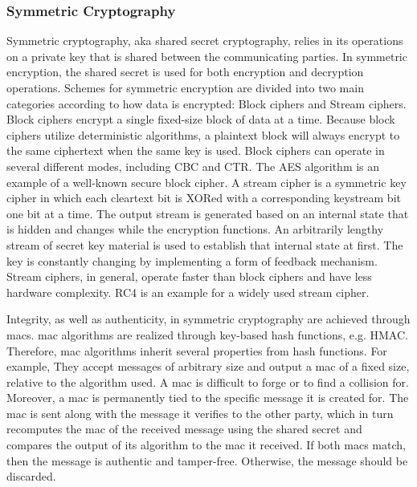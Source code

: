 \subsubsection{Symmetric Cryptography}
Symmetric cryptography, aka shared secret cryptography, relies in its operations on a private key that is shared between the communicating parties. In symmetric encryption, the shared secret is used for both encryption and decryption operations. Schemes for symmetric encryption are divided into two main categories according to how data is encrypted: Block ciphers and Stream ciphers.
Block ciphers encrypt a single fixed-size block of data at a time. Because block ciphers utilize deterministic algorithms, a plaintext block will always encrypt to the same ciphertext when the same key is used. Block ciphers can operate in several different modes, including CBC and CTR. The AES algorithm is an example of a well-known secure block cipher.
A stream cipher is a symmetric key cipher in which each cleartext bit is XORed with a corresponding keystream bit one bit at a time. The output stream is generated based on an internal state that is hidden and changes while the encryption functions. An arbitrarily lengthy stream of secret key material is used to establish that internal state at first. The key is constantly changing by implementing a form of feedback mechanism. Stream ciphers, in general, operate faster than block ciphers and have less hardware complexity. RC4 is an example for a widely used stream cipher.
\par
Integrity, as well as authenticity, in symmetric cryptography are achieved through \glspl{mac}. \gls{mac} algorithms are realized through key-based hash functions, e.g. HMAC. Therefore, \gls{mac} algorithms inherit several properties from hash functions. For example, They accept messages of arbitrary size and output a \gls{mac} of a fixed size, relative to the algorithm used. A \gls{mac} is difficult to forge or to find a collision for. Moreover, a \gls{mac} is permanently tied to the specific message it is created for.
The \gls{mac} is sent along with the message it verifies to the other party, which in turn recomputes the \gls{mac} of the received message using the shared secret and compares the output of its algorithm to the \gls{mac} it received. If both \glspl{mac} match, then the message is authentic and tamper-free. Otherwise, the message should be discarded.


